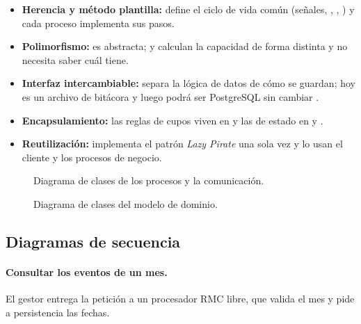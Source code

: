 \begin{itemize}
    \item \textbf{Herencia y método plantilla:}  define el
          ciclo de vida común (señales, , ,
          ) y cada proceso implementa sus pasos.
    \item \textbf{Polimorfismo:}  es abstracta; 
          y  calculan la capacidad de forma distinta y
           no necesita saber cuál tiene.
    \item \textbf{Interfaz intercambiable:}  separa la lógica de
          datos de cómo se guardan; hoy es un archivo de bitácora y luego podrá ser
          PostgreSQL sin cambiar .
    \item \textbf{Encapsulamiento:} las reglas de cupos viven en 
          y las de estado en  y .
    \item \textbf{Reutilización:}  implementa el patrón
          \emph{Lazy Pirate} una sola vez y lo usan el cliente y los procesos de negocio.
\end{itemize}

\begin{figure}
    \centering
    \resizebox{\linewidth}{!}{}
    \caption{Diagrama de clases de los procesos y la comunicación.}
    \label{fig:clases-servicios}
\end{figure}

\begin{figure}
    \centering
    \resizebox{\linewidth}{!}{}
    \caption{Diagrama de clases del modelo de dominio.}
    \label{fig:clases-dominio}
\end{figure}
\clearpage

\subsection{Diagramas de secuencia}

\paragraph{Consultar los eventos de un mes.} El gestor entrega la petición a un
procesador RMC libre, que valida el mes y pide a persistencia las fechas.

